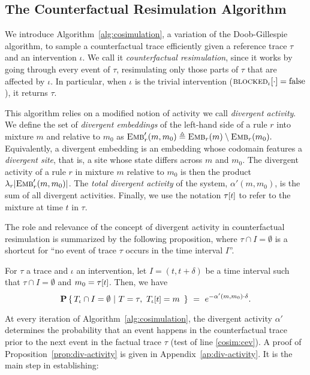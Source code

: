 \subsection{The Counterfactual Resimulation Algorithm}
\label{subsec:cosim-algo}

We introduce Algorithm~\ref{alg:cosimulation}, a
variation of the Doob-Gillespie algorithm, to sample a counterfactual
trace efficiently given a reference trace $\tau$ and an intervention
$\iota$. We call it \emph{counterfactual resimulation}, since it works
by going through every event of $\tau$, resimulating only those parts
of $\tau$ that are affected by $\iota$. In particular, when $\iota$ is
the trivial intervention (${\textsc{blocked}}_{\iota}[\cdot] = \text{false}$), it
returns $\tau$.

This algorithm relies on a modified notion of activity we call
\emph{divergent activity}. We define the set of \emph{divergent
  embeddings} of the left-hand side of a rule $r$ into mixture $m$ and
relative to $m_0$ as
${\textsc{Emb}}'_{r}(m, m_0) \triangleq {\textsc{Emb}}_{r}(m) \setminus {\textsc{Emb}}_{r}(m_0).$
Equivalently, a divergent embedding is an embedding whose codomain
features a \emph{divergent site}, that is, a site whose state differs
across $m$ and $m_0$. The {divergent activity} of a rule $r$ in
mixture $m$ relative to $m_0$ is then the product
$\lambda_r|{\textsc{Emb}}'_{r}(m, m_0)|$. The \emph{total divergent activity} of
the system, $\alpha'(m, m_0)$, is the sum of all divergent
activities. Finally, we use the notation $\TSTATE{t}{\tau}$ to refer
to the mixture at time $t$ in $\tau$.



The role and relevance of the concept of divergent activity in
counterfactual resimulation is summarized by the following
proposition, where $\tau \cap I = \emptyset$ is a shortcut for ``no
event of trace $\tau$ occurs in the time interval $I$''.
\begin{proposition}\label{prop:div-activity}
  For $\tau$ a trace and $\iota$ an intervention, let
  $I = (t, t+\delta)$ be a time interval such that
  $\tau \cap I = \emptyset$ and $m_0 = \TSTATE{t}{\tau}$. Then, we
  have
  \[\CProb{ \ATRAJ{} \cap I = \emptyset }{ T=\tau,\
      \TSTATE{t}{\ATRAJ{}} = m\ }
    \ =\ e^{-\alpha'(m, m_0) \cdot \delta}.
  \]
\end{proposition}
\noindent At every iteration of Algorithm~\ref{alg:cosimulation}, the
divergent activity $\alpha'$ determines the probability that an event
happens in the counterfactual trace prior to the next event in the
factual trace $\tau$ (test of line \ref{cosim:cev}). A proof of
Proposition~\ref{prop:div-activity} is given in
Appendix~\ref{ap:div-activity}.
It is the main step in establishing:

